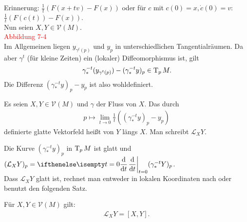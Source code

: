 \begin{bem}
  Erinnerung: $\frac{1}t(F(x+tv)-F(x))$ oder für $c$ mit $c(0) = x, \dot c(0) = v$: $\frac{1}t(F(c(t))-F(x))$.\\

  Nun seien $X,Y \in \mathcal V(M)$.\\
  \textcolor{red}{Abbildung 7-4}\\

Im Allgemeinen liegen $y_{\gamma^t(p)}$ und $y_p$ in unterschiedlichen Tangentialräumen.
Da aber $\gamma^t$ (für kleine Zeiten) ein (lokaler) Diffeomorphismus ist, gilt
\begin{align*}
  \gamma_{*}^{-t}(y_{\gamma^t(p)})-(\gamma_{*}^{-t}y)_p \in \operatorname{T}_pM.
\end{align*}
Die Differenz $(\gamma_{*}^{-t}y)_p - y_p$ ist also wohldefiniert. 
\end{bem}

\begin{dfn}
  Es seien $X,Y \in \mathcal V(M)$ und $\gamma$ der Fluss von $X$.
Das durch 
\begin{align*}
  p \mapsto \lim_{t\to 0}\frac{1}t\left(\left(\gamma_{*}^{-t}y\right)_p-y_p\right)
\end{align*}
definierte glatte Vektorfeld heißt  von $Y$ längs $X$. Man schreibt $\mathcal L_XY$.
\end{dfn}

\begin{bem}
  Die Kurve $(\gamma_{*}^{-t}y)_p$ in $\operatorname{T}_pM$ ist glatt und $(\mathcal L_XY)_p = \difffrac[t=0]{}{t}(\gamma_{*}^{-t}Y)_p$.\\
Dass $\mathcal L_XY$ glatt ist, rechnet man entweder in lokalen Koordinaten nach oder benutzt den folgenden Satz.
\end{bem}

\begin{satz}
  Für $X,Y \in \mathcal V(M)$ gilt:
  \begin{align*}
    \mathcal L_XY = [X,Y].
  \end{align*}
\end{satz}

